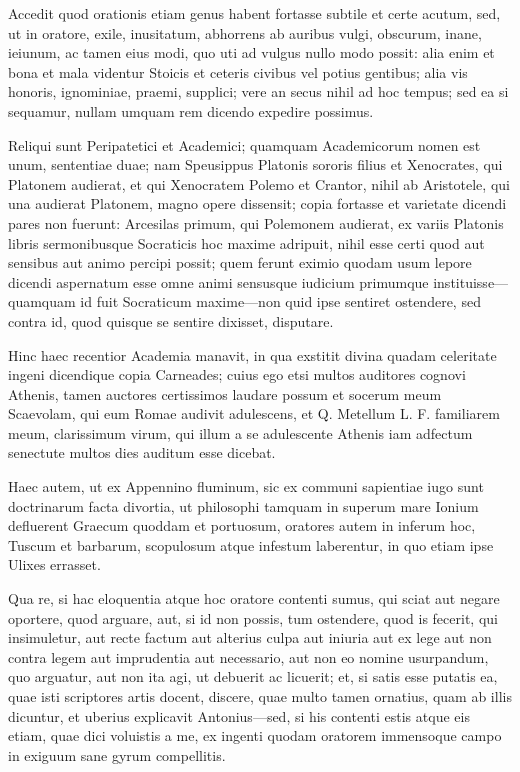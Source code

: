  Accedit quod orationis etiam genus habent fortasse subtile et certe acutum, sed, ut in oratore, exile, inusitatum, abhorrens ab auribus vulgi, obscurum, inane, ieiunum, ac tamen eius modi, quo uti ad vulgus nullo modo possit: alia enim et bona et mala videntur Stoicis et ceteris civibus vel potius gentibus; alia vis honoris, ignominiae, praemi, supplici; vere an secus nihil ad hoc tempus; sed ea si sequamur, nullam umquam rem dicendo expedire possimus.

 Reliqui sunt Peripatetici et Academici; quamquam Academicorum nomen est unum, sententiae duae; nam Speusippus Platonis sororis filius et Xenocrates, qui Platonem audierat, et qui Xenocratem Polemo et Crantor, nihil ab Aristotele, qui una audierat Platonem, magno opere dissensit; copia fortasse et varietate dicendi pares non fuerunt: Arcesilas primum, qui Polemonem audierat, ex variis Platonis libris sermonibusque Socraticis hoc maxime adripuit, nihil esse certi quod aut sensibus aut animo percipi possit; quem ferunt eximio quodam usum lepore dicendi aspernatum esse omne animi sensusque iudicium primumque instituisse—quamquam id fuit Socraticum maxime—non quid ipse sentiret ostendere, sed contra id, quod quisque se sentire dixisset, disputare.

 Hinc haec recentior Academia manavit, in qua exstitit divina quadam celeritate ingeni dicendique copia Carneades; cuius ego etsi multos auditores cognovi Athenis, tamen auctores certissimos laudare possum et socerum meum Scaevolam, qui eum Romae audivit adulescens, et Q. Metellum L. F. familiarem meum, clarissimum virum, qui illum a se adulescente Athenis iam adfectum senectute multos dies auditum esse dicebat.

 Haec autem, ut ex Appennino fluminum, sic ex communi sapientiae iugo sunt doctrinarum facta divortia, ut philosophi tamquam in superum mare Ionium defluerent Graecum quoddam et portuosum, oratores autem in inferum hoc, Tuscum et barbarum, scopulosum atque infestum laberentur, in quo etiam ipse Ulixes errasset.

 Qua re, si hac eloquentia atque hoc oratore contenti sumus, qui sciat aut negare oportere, quod arguare, aut, si id non possis, tum ostendere, quod is fecerit, qui insimuletur, aut recte factum aut alterius culpa aut iniuria aut ex lege aut non contra legem aut imprudentia aut necessario, aut non eo nomine usurpandum, quo arguatur, aut non ita agi, ut debuerit ac licuerit; et, si satis esse putatis ea, quae isti scriptores artis docent, discere, quae multo tamen ornatius, quam ab illis dicuntur, et uberius explicavit Antonius—sed, si his contenti estis atque eis etiam, quae dici voluistis a me, ex ingenti quodam oratorem immensoque campo in exiguum sane gyrum compellitis.

